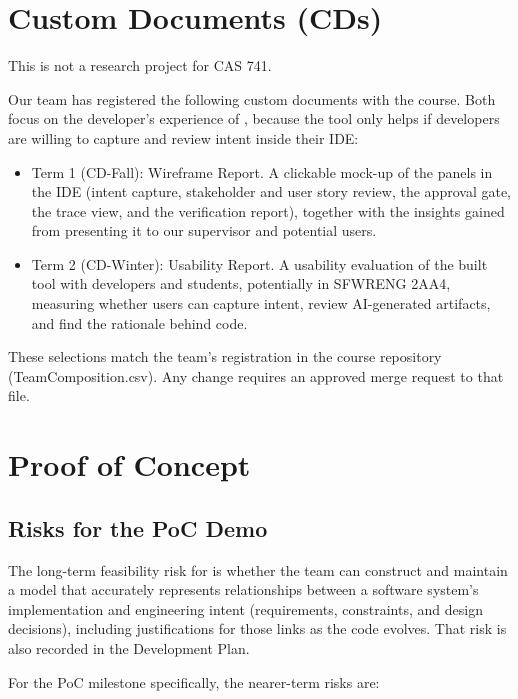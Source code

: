 \documentclass{article}
\begin{document}
\section{Custom Documents (CDs)}

This is not a research project for CAS 741.

Our team has registered the following custom documents with the course. Both
focus on the developer's experience of \progname{}, because the tool only
helps if developers are willing to capture and review intent inside their IDE:

\begin{itemize}
  \item Term 1 (CD-Fall): Wireframe Report. A clickable mock-up of the
  \progname{} panels in the IDE (intent capture, stakeholder and user story
  review, the approval gate, the trace view, and the verification report),
  together with the insights gained from presenting it to our supervisor and
  potential users.
  \item Term 2 (CD-Winter): Usability Report. A usability evaluation of the
  built tool with developers and students, potentially in SFWRENG 2AA4,
  measuring whether users can capture intent, review AI-generated artifacts,
  and find the rationale behind code.
\end{itemize}

These selections match the team's registration in the course repository
(TeamComposition.csv). Any change requires an approved merge request to that
file.

\section{Proof of Concept}

\subsection{Risks for the PoC Demo}

The long-term feasibility risk for \progname{} is whether the team can
construct and maintain a model that accurately represents relationships between
a software system's implementation and engineering intent (requirements,
constraints, and design decisions), including justifications for those links as
the code evolves. That risk is also recorded in the Development Plan.

For the PoC milestone specifically, the nearer-term risks are:
\end{document}
